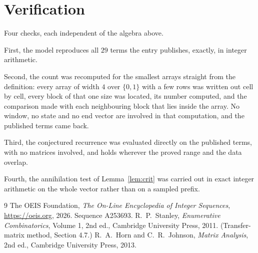\documentclass[11pt,a4paper]{article}
\theoremstyle{plain}
\theoremstyle{definition}
\begin{document}
\section{Verification}

Four checks, each independent of the algebra above.

First, the model reproduces all $29$ terms the entry publishes, exactly, in integer
arithmetic.

Second, the count was recomputed for the smallest arrays straight from the definition: every
array of width $4$ over $\{0,1\}$ with a few rows was written out cell by cell, every block of
that one size was located, its number computed, and the comparison made with each neighbouring block
that lies inside the array. No window, no state and no end vector are involved in that
computation, and the published terms came back.

Third, the conjectured recurrence was evaluated directly on the published terms, with no
matrices involved, and holds wherever the proved range and the data overlap.

Fourth, the annihilation test of Lemma~\ref{lem:crit} was carried out in exact integer
arithmetic on the whole vector rather than on a sampled prefix.

\begin{thebibliography}{9}
 The OEIS Foundation, \emph{The On-Line Encyclopedia of Integer
Sequences}, \url{https://oeis.org}, 2026. Sequence A253693.
 R.~P.~Stanley, \emph{Enumerative Combinatorics}, Volume 1, 2nd ed.,
Cambridge University Press, 2011. (Transfer-matrix method, Section 4.7.)
 R.~A.~Horn and C.~R.~Johnson, \emph{Matrix Analysis}, 2nd ed., Cambridge
University Press, 2013.
\end{thebibliography}
\end{document}
